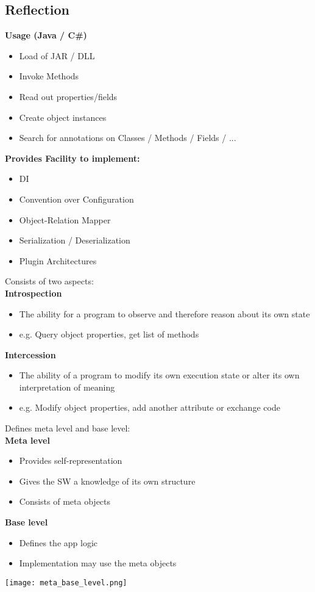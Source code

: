 \subsection{Reflection}
\textbf{Usage (Java / C\#)}
\begin{itemize}
    \item Load of JAR / DLL
    \item Invoke Methods
    \item Read out properties/fields
    \item Create object instances
    \item Search for annotations on Classes / Methods / Fields / ...
\end{itemize}
\textbf{Provides Facility to implement:}
\begin{itemize}
    \item DI
    \item Convention over Configuration
    \item Object-Relation Mapper
    \item Serialization / Deserialization
    \item Plugin Architectures
\end{itemize}
Consists of two aspects:\\
\textbf{Introspection}
\begin{itemize}
    \item The ability for a program to observe and therefore reason about its own state
    \item e.g. Query object properties, get list of methods
\end{itemize}
\textbf{Intercession}
\begin{itemize}
    \item The ability of a program to modify its own execution state or alter its own interpretation of meaning
    \item e.g. Modify object properties, add another attribute or exchange code
\end{itemize}
Defines meta level and base level:\\
\textbf{Meta level}
\begin{itemize}
    \item Provides self-representation
    \item Gives the SW a knowledge of its own structure
    \item Consists of meta objects
\end{itemize}
\textbf{Base level}
\begin{itemize}
    \item Defines the app logic
    \item Implementation may use the meta objects
\end{itemize}
\texttt{[image: meta\_base\_level.png]}
